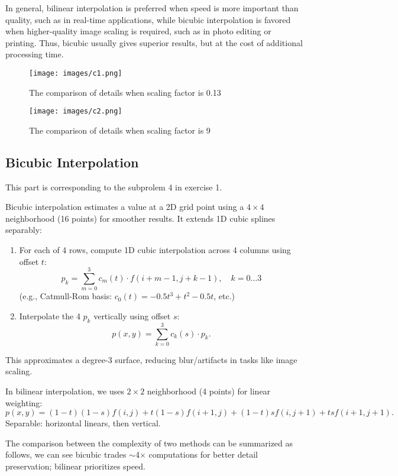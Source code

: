 \documentclass[12pt]{article}
\begin{document}
In general, bilinear interpolation is preferred when speed is more important than quality, such as in real-time applications, while bicubic interpolation is favored when higher-quality image scaling is required, such as in photo editing or printing. Thus, bicubic usually gives superior results, but at the cost of additional processing time.

\begin{figure}[H]
    \centering
    \texttt{[image: images/c1.png]}
    \caption{The comparison of details when scaling factor is 0.13}
\end{figure}
\begin{figure}[H]
    \centering
    \texttt{[image: images/c2.png]}
    \caption{The comparison of details when scaling factor is 9}
\end{figure}


\subsection{Bicubic Interpolation}
This part is corresponding to the subprolem 4 in exercise 1.

Bicubic interpolation estimates a value at a 2D grid point using a $4\times4$ neighborhood (16 points) for smoother results. It extends 1D cubic splines separably: 

\begin{enumerate}
\item For each of 4 rows, compute 1D cubic interpolation across 4 columns using offset $t$:
\[
p_k = \sum_{m=0}^{3} c_m(t) \cdot f(i+m-1, j+k-1), \quad k=0\dots3
\]
(e.g., Catmull-Rom basis: $c_0(t) = -0.5t^3 + t^2 - 0.5t$, etc.)

\item Interpolate the 4 $p_k$ vertically using offset $s$:
\[
p(x,y) = \sum_{k=0}^{3} c_k(s) \cdot p_k.
\]
\end{enumerate}

This approximates a degree-3 surface, reducing blur/artifacts in tasks like image scaling.

In bilinear interpolation, we uses $2\times2$ neighborhood (4 points) for linear weighting:
\[
p(x,y) = (1-t)(1-s)f(i,j) + t(1-s)f(i+1,j) + (1-t)sf(i,j+1) + ts f(i+1,j+1).
\]
Separable: horizontal linears, then vertical.

The comparison between the complexity of two methods can be summarized as follows, we can see bicubic trades $\sim$4$\times$ computations for better detail preservation; bilinear prioritizes speed.
\end{document}

